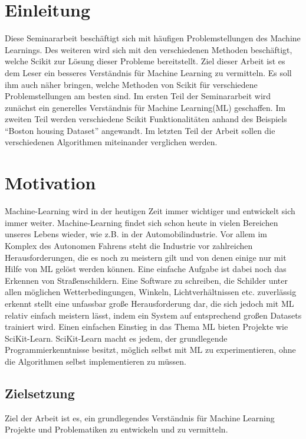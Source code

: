\chapter{Einleitung}
\label{chap:einleitung}
Diese Seminararbeit beschäftigt sich mit häufigen Problemstellungen des Machine Learnings. Des weiteren wird sich mit den verschiedenen Methoden beschäftigt, welche Scikit zur Lösung dieser Probleme bereitstellt. Ziel dieser Arbeit ist es dem Leser ein besseres Verständnis für Machine Learning zu vermitteln. Es soll ihm auch näher bringen, welche Methoden von Scikit für verschiedene Problemstellungen am besten sind. Im ersten Teil der Seminararbeit wird zunächst ein generelles Verständnis für Machine Learning(ML) geschaffen. Im zweiten Teil werden verschiedene Scikit Funktionalitäten anhand des Beispiels “Boston housing Dataset” angewandt. Im letzten Teil der Arbeit sollen die verschiedenen Algorithmen miteinander verglichen werden.

\chapter{Motivation}
\label{sec:motivation}
Machine-Learning wird in der heutigen Zeit immer wichtiger und entwickelt sich immer weiter.\cite{MB} Machine-Learning findet sich schon heute in vielen Bereichen unseres Lebens wieder, wie z.B. in der Automobilindustrie. Vor allem im Komplex des Autonomen Fahrens steht die Industrie vor zahlreichen Herausforderungen, die es noch zu meistern gilt und von denen einige nur mit Hilfe von ML gelöst werden können. Eine einfache Aufgabe ist dabei noch das Erkennen von Straßenschildern. Eine Software zu schreiben, die Schilder unter allen möglichen Wetterbedingungen, Winkeln, Lichtverhältnissen etc. zuverlässig erkennt stellt eine unfassbar große Herausforderung dar, die sich jedoch mit ML relativ einfach meistern lässt, indem ein System auf entsprechend großen Datasets trainiert wird. 
Einen einfachen Einstieg in das Thema ML bieten Projekte wie SciKit-Learn. SciKit-Learn macht es jedem, der grundlegende Programmierkenntnisse besitzt, möglich selbst mit ML zu experimentieren, ohne die Algorithmen selbst implementieren zu müssen.



\section{Zielsetzung}
\label{sec:zielsetzung}
Ziel der Arbeit ist es, ein grundlegendes Verständnis für Machine Learning Projekte und Problematiken zu entwickeln und zu vermitteln.
